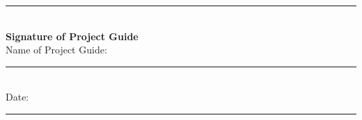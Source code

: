 \vspace{1.0cm}


\begin{center}

\rule{6cm}{0.2px}\\
\textbf{Signature of Project Guide}\\[0.4cm]

Name of Project Guide: \rule{5cm}{0.2px}\\[0.4cm]

Date: \rule{3cm}{0.2px}

\end{center}

